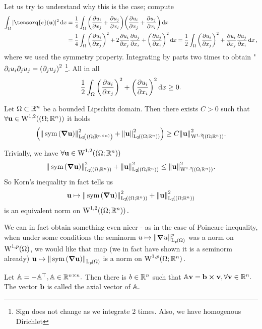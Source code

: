 \documentclass[11pt]{scrartcl} %
\begin{document}
Let us try to understand why this is the case; compute
	\begin{align*}
		\int_{\Omega}|\tensorq{e}(\vb{u})|^{2}\dd{x} &= \frac{1}{4}\int_{\Omega}\qty(\pdv{u_i}{x_j}+\pdv{u_j}{x_i})\qty(\pdv{u_i}{x_j}+\pdv{u_j}{x_i})\dd{x} \\
								 &= \frac{1}{4} \int_{\Omega}\qty(\pdv{u_i}{x_j})^{2} + 2\pdv{u_i}{x_j}\pdv{u_j}{x_i} + \qty(\pdv{u_j}{x_i})^{2} \dd{x} = \frac{1}{2}\int_{\Omega}\qty(\pdv{u_i}{x_j})^{2}+ \pdv{u_i}{x_j}\pdv{u_j}{x_i}\dd{x},
	\end{align*}
	where we used the symmetry property. Integrating by parts two times to obtain "$\partial_{i}u_i \partial_{j}u_j = \qty(\partial_{j}u_j)^{2}$ \footnote{Sign does not change as we integrate 2 times. Also, we have homogenous Dirichlet}. All in all
	\[
		\frac{1}{2}\int_{\Omega}\qty(\pdv{u_i}{x_j})^{2} + \qty(\pdv{u_i}{x_i})^{2}\dd{x} \geq 0.
	\]

\begin{theorem}
Let $\Omega \subset {\mathbb R}^n$ be a bounded Lipschitz domain. Then there exists $C>0$ such that $\forall \vb{u} \in \WkpSet[1][2]{\qty(\Omega;\R^n)}$ it holds
\[
\qty(\norm{\, \text{sym} \,\qty(\grad \vb{u})}_{\LpSet[2]{(\Omega; \R^{n \times n)}}}^{2}+\norm{\vb{u}}_{\LpSet[2]{(\Omega; \R^n)}}^{2}) \geq C \norm{\vb{u}}_{\WkpSet[1][2]{(\Omega;\R^n)}}^{2}.
\]
\end{theorem}
\begin{remark}
	Trivially, we have $\forall \vb{u} \in \WkpSet[1][2]{\qty(\Omega;\R^{n})}$ 
	\[
		\norm{\, \text{sym} \,\qty(\grad \vb{u})}_{\LpSet[2]{\qty(\Omega;\R^{n})}}^{2} + \norm{\vb{u}}_{\LpSet[2]{\qty(\Omega;\R^{n})}}^{2} \leq \norm{\vb{u}}_{\WkpSet[1][2]{\qty(\Omega;\R^{n})}}^{2}.
	\]
	So Korn's inequality in fact tells us
	\[
		\vb{u} \mapsto \norm{\, \text{sym} \,\qty(\grad \vb{u})}_{\LpSet[2]{\qty(\Omega;\R^{n})}}^{2} + \norm{\vb{u}}_{\LpSet[2]{\qty(\Omega;\R^{n})}}^{2}
	\]
	is an equivalent norm on $\WkpSet[1][2]{\qty(\Omega; \R^{n})}.$
\end{remark}


We can in fact obtain something even nicer - as in the case of Poincare inequality, when under some conditions the seminorm $u \mapsto \norm{\grad u}_{\LpSet[p]{\Omega}}^p$ was a norm on $\WkpSet[1][p]{\Omega}$, we would like that map (we in fact have shown it is a seminorm already) $\vb{u} \mapsto \norm{\, \text{sym} \,\qty(\grad \vb{u})}_{\LpSet[p]{\Omega}}$ is a norm on $\WkpSet[1][p]{\Omega;\R^{n}}.$

\begin{definition}
	Let $\mathbb{A} = - \mathbb{A}^\top, \mathbb{A} \in {\mathbb R}^{n \times n}.$ Then there is $b \in {\mathbb R}^n$ such that $\mathbb{A} \vb{v} = \vb{b} \cross \vb{v}, \forall \vb{v} \in {\mathbb R}^n.$ The vector $\vb{b}$ is called the axial vector of $\mathbb{A}.$
\end{definition}
\end{document}
